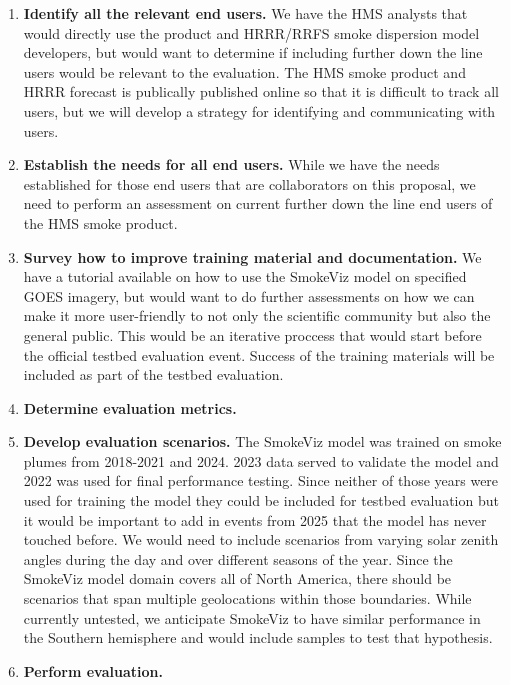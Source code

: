 \begin{enumerate}
    \item \textbf{Identify all the relevant end users.} We have the HMS analysts that would directly use the product and HRRR/RRFS smoke dispersion model developers, but would want to determine if including further down the line users would be relevant to the evaluation. The HMS smoke product and HRRR forecast is publically published online so that it is difficult to track all users, but we will develop a strategy for identifying and communicating with users.

    \item \textbf{Establish the needs for all end users.} While we have the needs established for those end users that are collaborators on this proposal, we need to perform an assessment on current further down the line end users of the HMS smoke product.

    \item \textbf{Survey how to improve training material and documentation.} We have a tutorial available on how to use the SmokeViz model on specified GOES imagery, but would want to do further assessments on how we can make it more user-friendly to not only the scientific community but also the general public. This would be an iterative proccess that would start before the official testbed evaluation event. Success of the training materials will be included as part of the testbed evaluation.


\item \textbf{Determine evaluation metrics.} 

    \item \textbf{Develop evaluation scenarios.} The SmokeViz model was trained on smoke plumes from 2018-2021 and 2024. 2023 data served to validate the model and 2022 was used for final performance testing. Since neither of those years were used for training the model they could be included for testbed evaluation but it would be important to add in events from 2025 that the model has never touched before. We would need to include scenarios from varying solar zenith angles during the day and over different seasons of the year. Since the SmokeViz model domain covers all of North America, there should be scenarios that span multiple geolocations within those boundaries. While currently untested, we anticipate SmokeViz to have similar performance in the Southern hemisphere and would include samples to test that hypothesis.

    \item \textbf{Perform evaluation.} 

\end{enumerate}



